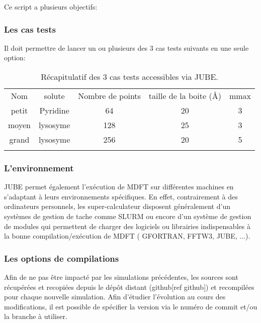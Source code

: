 Ce script a plusieurs objectifs:


\subsubsection{ Les cas tests }
Il doit permettre de lancer un ou plusieurs des 3 cas tests suivants en une seule option:

\begin{table}[H]
  \begin{center}
    \begin{tabular}{c c c c c }
      \hline & \\[-1em]\hline
      Nom & solute & Nombre de points & taille de la boite (\AA) & mmax  \\
      \hline
      petit & Pyridine & 64 & 20 & 3  \\
      moyen & lysosyme & 128 & 25 & 3  \\
      grand & lysosyme & 256 & 20 & 5  \\
      \hline & \\[-1em]\hline%
    \end{tabular}
  \end{center}
  \caption{Récapitulatif des 3 cas tests accessibles via JUBE.}
  \label{tab:JUBE_bench_cases}  
\end{table}


\subsubsection{ L'environnement }
JUBE permet également l’exécution de MDFT sur différentes machines en s'adaptant à leurs environnements spécifiques. En effet, contrairement à des ordinateurs personnels, les super-calculateur disposent généralement d'un systèmes de gestion de tache comme SLURM ou encore d'un système de gestion de modules qui permettent de charger des logiciels ou librairies indispensables à la bonne compilation/exécution de MDFT ( GFORTRAN, FFTW3, JUBE, ...).


\subsubsection{ Les options de compilations }
Afin de ne pas être impacté par les simulations précédentes, les sources sont récupérées et recopiées depuis le dépôt distant (github[ref github]) et recompilées pour chaque nouvelle simulation. Afin d'étudier l'évolution au cours des modifications, il est possible de spécifier la version via le numéro de commit et/ou la branche à utiliser.

